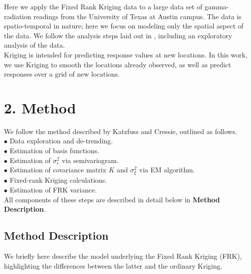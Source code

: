 \documentclass[11pt]{article}
\begin{document}
Here we apply the Fixed Rank Kriging data to a large data set of gamma-radiation readings from the University of Texas at Austin campus.  The data is spatio-temporal in nature; here we focus on modeling only the spatial aspect of the data.  We follow the analysis steps laid out in \cite{Katzfuss}, including an exploratory analysis of the data. \\

Kriging is intended for predicting response values at new locations.  In this work, we use Kriging to smooth the locations already observed, as well as predict responses over a grid of new locations. \\

\newpage
\section{2. Method}

We follow the method described by Katzfuss and Cressie, outlined as follows. \\
$\bullet$ Data exploration and de-trending. \\
$\bullet$ Estimation of basis functions. \\
$\bullet$ Estimation of $\sigma^2_\epsilon$ via semivariogram. \\
$\bullet$ Estimation of covariance matrix $K$ and $\sigma^2_\xi$ via EM algorithm. \\
$\bullet$ Fixed-rank Kriging calculations. \\
$\bullet$ Estimation of FRK variance. \\

All components of these steps are described in detail below in \textbf{Method Description}. \\


\subsection{Method Description}

We briefly here describe the model underlying the Fixed Rank Kriging (FRK), highlighting the differences between the latter and the ordinary Kriging. \\
\end{document}
